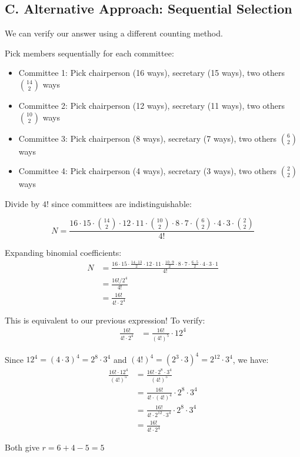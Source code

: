 \documentclass[12pt]{article}
\begin{document}
\begin{solutionbox}
\subsection*{C. Alternative Approach: Sequential Selection}

We can verify our answer using a different counting method.

Pick members sequentially for each committee:
\begin{itemize}
    \item Committee 1: Pick chairperson (16 ways), secretary (15 ways), two others $\binom{14}{2}$ ways
    \item Committee 2: Pick chairperson (12 ways), secretary (11 ways), two others $\binom{10}{2}$ ways
    \item Committee 3: Pick chairperson (8 ways), secretary (7 ways), two others $\binom{6}{2}$ ways
    \item Committee 4: Pick chairperson (4 ways), secretary (3 ways), two others $\binom{2}{2}$ ways
\end{itemize}

Divide by $4!$ since committees are indistinguishable:

$$N = \frac{16 \cdot 15 \cdot \binom{14}{2} \cdot 12 \cdot 11 \cdot \binom{10}{2} \cdot 8 \cdot 7 \cdot \binom{6}{2} \cdot 4 \cdot 3 \cdot \binom{2}{2}}{4!}$$

Expanding binomial coefficients:
\begin{align*}
    N &= \frac{16 \cdot 15 \cdot \frac{14 \cdot 13}{2} \cdot 12 \cdot 11 \cdot \frac{10 \cdot 9}{2} \cdot 8 \cdot 7 \cdot \frac{6 \cdot 5}{2} \cdot 4 \cdot 3 \cdot 1}{4!} \\
    &= \frac{16! / 2^4}{4!} \\
    &= \frac{16!}{4! \cdot 2^4}
\end{align*}

This is equivalent to our previous expression! To verify:
\begin{align*}
    \frac{16!}{4! \cdot 2^4} &= \frac{16!}{(4!)^5} \cdot 12^4
\end{align*}

Since $12^4 = (4 \cdot 3)^4 = 2^8 \cdot 3^4$ and $(4!)^4 = (2^3 \cdot 3)^4 = 2^{12} \cdot 3^4$, we have:
\begin{align*}
    \frac{16! \cdot 12^4}{(4!)^5} &= \frac{16! \cdot 2^8 \cdot 3^4}{(4!)^5} \\
    &= \frac{16!}{4! \cdot (4!)^4} \cdot 2^8 \cdot 3^4 \\
    &= \frac{16!}{4! \cdot 2^{12} \cdot 3^4} \cdot 2^8 \cdot 3^4 \\
    &= \frac{16!}{4! \cdot 2^4}
\end{align*}

Both give $r = 6 + 4 - 5 = 5$ \checkmark

\end{solutionbox}
\end{document}
